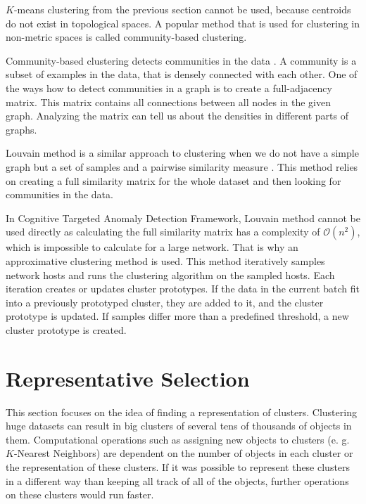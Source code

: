 \documentclass[thesis=B,english]{FITthesis}[2012/10/20]
\begin{document}
$K$-means clustering from the previous section cannot be used, because centroids do not exist in topological spaces.
A popular method that is used for clustering in non-metric spaces is called community-based clustering.

Community-based clustering detects communities in the data \cite{kopp2018community}.
A community is a subset of examples in the data, that is densely connected with each other.
One of the ways how to detect communities in a graph is to create a full-adjacency matrix.
This matrix contains all connections between all nodes in the given graph.
Analyzing the matrix can tell us about the densities in different parts of graphs.

Louvain method is a similar approach to clustering when we do not have a simple graph but a set of samples and a pairwise similarity measure \cite{kopp2018community}.
This method relies on creating a full similarity matrix for the whole dataset and then looking for communities in the data.

In Cognitive Targeted Anomaly Detection Framework, Louvain method cannot be used directly as calculating the full similarity matrix has a complexity of $\mathcal{O}(n^2)$, which is impossible to calculate for a large network.
That is why an approximative clustering method is used.
This method iteratively samples network hosts and runs the clustering algorithm on the sampled hosts.
Each iteration creates or updates cluster prototypes.
If the data in the current batch fit into a previously prototyped cluster, they are added to it, and the cluster prototype is updated.
If samples differ more than a predefined threshold, a new cluster prototype is created.

\section{Representative Selection}
\label{sec:representative_selection}

This section focuses on the idea of finding a representation of clusters.
Clustering huge datasets can result in big clusters of several tens of thousands of objects in them.
Computational operations such as assigning new objects to clusters (e. g. $K$-Nearest Neighbors) are dependent on the number of objects in each cluster or the representation of these clusters.
If it was possible to represent these clusters in a different way than keeping all track of all of the objects, further operations on these clusters would run faster.
\end{document}
